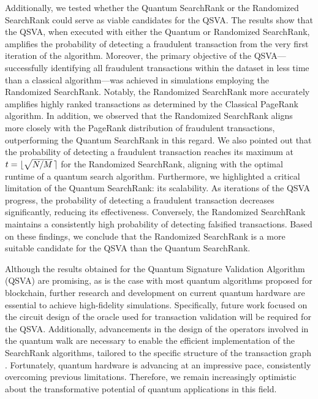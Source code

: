\documentclass[nofootinbib,aps,prd,reprint,superscriptaddress,floatfix]{revtex4-2}
\begin{document}
Additionally, we tested whether the Quantum SearchRank or the Randomized SearchRank could serve as viable candidates for the QSVA. The results show that the QSVA, when executed with either the Quantum or Randomized SearchRank, amplifies the probability of detecting a fraudulent transaction from the very first iteration of the algorithm. Moreover, the primary objective of the QSVA—successfully identifying all fraudulent transactions within the dataset in less time than a classical algorithm—was achieved in simulations employing the Randomized SearchRank. Notably, the Randomized SearchRank more accurately amplifies highly ranked transactions as determined by the Classical PageRank algorithm. In addition, we observed that the Randomized SearchRank aligns more closely with the PageRank distribution of fraudulent transactions, outperforming the Quantum SearchRank in this regard. We also pointed out that the probability of detecting a fraudulent transaction reaches its maximum at $t=\lfloor\sqrt{N/M} \hspace{1.5pt}\rceil$ for the Randomized SearchRank, aligning with the optimal runtime of a quantum search algorithm. Furthermore, we highlighted a critical limitation of the Quantum SearchRank: its scalability. As iterations of the QSVA progress, the probability of detecting a fraudulent transaction decreases significantly, reducing its effectiveness. Conversely, the Randomized SearchRank maintains a consistently high probability of detecting falsified transactions. Based on these findings, we conclude that the Randomized SearchRank is a more suitable candidate for the QSVA than the Quantum SearchRank. 

Although the results obtained for the Quantum Signature Validation Algorithm (QSVA) are promising, as is the case with most quantum algorithms proposed for blockchain, further research and development on current quantum hardware are essential to achieve high-fidelity simulations. Specifically, future work focused on the circuit design of the oracle used for transaction validation will be required for the QSVA. Additionally, advancements in the design of the operators involved in the quantum walk are necessary to enable the efficient implementation of the SearchRank algorithms, tailored to the specific structure of the transaction graph \cite{Q_circuits}. Fortunately, quantum hardware is advancing at an impressive pace, consistently overcoming previous limitations. Therefore, we remain increasingly optimistic about the transformative potential of quantum applications in this field. 
\end{document}
